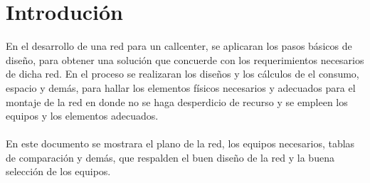 \documentclass[12pt]{article}
\begin{document}
\maketitle
\pagebreak

\tableofcontents

\pagebreak 
\section{\textbf{Introduci\'on}}
En el desarrollo de una red para un callcenter, se aplicaran los pasos básicos de diseño, para obtener una solución que concuerde con los requerimientos necesarios de dicha red. En el proceso se realizaran los diseños y los cálculos de el consumo, espacio y demás, para hallar los elementos físicos necesarios y adecuados para el montaje de la red en donde no se haga desperdicio de recurso y se empleen los equipos y los elementos adecuados.\\\\

En este documento se mostrara el plano de la red, los equipos necesarios, tablas de comparación y demás, que respalden el buen diseño de la red y la buena selección de los equipos.

\pagebreak
\end{document}
